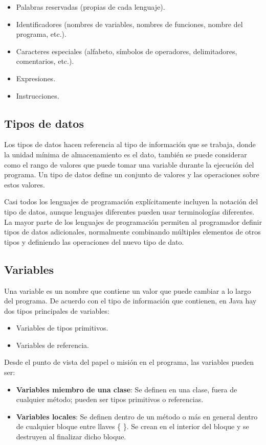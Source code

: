 \documentclass[11pt, twocolumn]{article}
\begin{document}
  \begin{itemize}
    \item Palabras reservadas (propias de cada lenguaje).
    \item Identificadores (nombres de variables, nombres de funciones, nombre del programa, etc.).
    \item Caracteres especiales (alfabeto, símbolos de operadores, delimitadores, comentarios, etc.).
    \item Expresiones.
    \item Instrucciones.
  \end{itemize}

  \subsection*{Tipos de datos}
  Los tipos de datos hacen referencia al tipo de información que se trabaja, donde la unidad mínima de almacenamiento es el dato, también se puede considerar como el rango de valores que puede tomar una variable durante la ejecución del programa. Un tipo de datos define un conjunto de valores y las operaciones sobre estos valores.

  Casi todos los lenguajes de programación explícitamente incluyen la notación del tipo de datos, aunque lenguajes diferentes pueden usar terminologías diferentes. La mayor parte de los lenguajes de programación permiten al programador definir tipos de datos adicionales, normalmente combinando múltiples elementos de otros tipos y definiendo las operaciones del nuevo tipo de dato.

  \subsection*{Variables}
  Una variable es un nombre que contiene un valor que puede cambiar a lo largo del programa. De acuerdo con el tipo de información que contienen, en Java hay dos tipos principales de variables:

  \begin{itemize}
    \item Variables de tipos primitivos.
    \item Variables de referencia.
  \end{itemize}

  Desde el punto de vista del papel o misión en el programa, las variables pueden ser:
  \begin{itemize}
    \item \textbf{Variables miembro de una clase}: Se definen en una clase, fuera de cualquier método; pueden ser tipos primitivos o referencias.
    \item \textbf{Variables locales}: Se definen dentro de un método o más en general dentro de cualquier bloque entre llaves \{ \}. Se crean en el interior del bloque y se destruyen al finalizar dicho bloque.
  \end{itemize}
\end{document}
